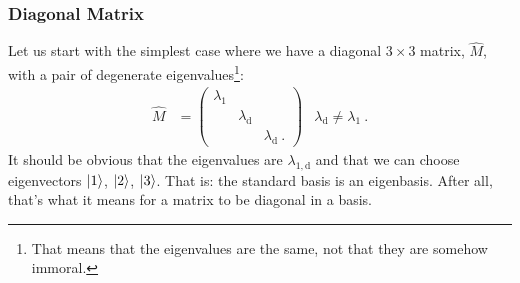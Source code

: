 \documentclass[12pt]{article}
\begin{document}
\subsubsection*{Diagonal Matrix}

Let us start with the simplest case where we have a diagonal $3\times 3$ matrix, $\hat M$, with a pair of degenerate eigenvalues\footnote{That means that the eigenvalues are the same, not that they are somehow immoral.}:
\begin{align} 
    \hat M &= 
    \begin{pmatrix}
        \lambda_1 & & \\
        & \lambda_\text{d} & \\
        & & \lambda_\text{d} \ .
    \end{pmatrix}
    &
    \lambda_\text{d}  \neq \lambda_1\ .
    \label{eq:degenerate:eigenvalue:diagonal}
\end{align}
It should be obvious that the eigenvalues are $\lambda_{1,\text{d}}$ and that we can choose eigenvectors $\left|1\right\rangle$, $\left|2\right\rangle$, $\left|3\right\rangle$. That is: the standard basis is an eigenbasis. After all, that's what it means for a matrix to be diagonal in a basis. 
\end{document}
